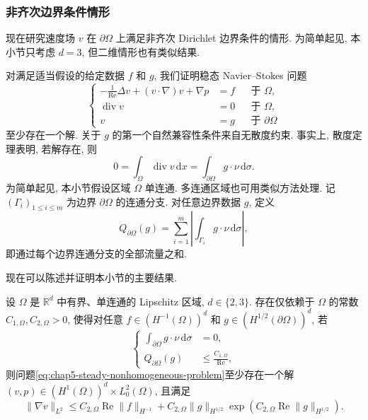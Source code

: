 \subsubsection{非齐次边界条件情形}
\label{subsec:chap5-steady-nonhomogeneous-boundary}

现在研究速度场 $v$ 在 $\partial\Omega$ 上满足非齐次 Dirichlet 边界条件的情形. 为简单起见, 本小节只考虑 $d=3$, 但二维情形也有类似结果.

对满足适当假设的给定数据 $f$ 和 $g$, 我们证明稳态 Navier--Stokes 问题
\begin{equation}
\left\{
\begin{aligned}
 -\frac1{\operatorname{Re}}\Delta v+(v\cdot\nabla)v+\nabla p&=f&&\text{于 }\Omega,\\
 \operatorname{div}v&=0&&\text{于 }\Omega,\\
 v&=g&&\text{于 }\partial\Omega
\end{aligned}
\right.
\label{eq:chap5-steady-nonhomogeneous-problem}
\end{equation}
至少存在一个解. 关于 $g$ 的第一个自然兼容性条件来自无散度约束. 事实上, 散度定理表明, 若解存在, 则
\[
 0=\int_\Omega\operatorname{div}v\,\mathrm dx
 =\int_{\partial\Omega}g\cdot\nu\,\mathrm d\sigma.
\]
为简单起见, 本小节假设区域 $\Omega$ 单连通. 多连通区域也可用类似方法处理. 记 $(\Gamma_i)_{1\leq i\leq m}$ 为边界 $\partial\Omega$ 的连通分支. 对任意边界数据 $g$, 定义
\[
 Q_{\partial\Omega}(g)=\sum_{i=1}^m\left|\int_{\Gamma_i}g\cdot\nu\,\mathrm d\sigma\right|,
\]
即通过每个边界连通分支的全部流量之和.

现在可以陈述并证明本小节的主要结果.

\begin{Theorem}
\label{thm:chap5-steady-nonhomogeneous-existence}
设 $\Omega$ 是 $\mathbb R^d$ 中有界、单连通的 Lipschitz 区域, $d\in\{2,3\}$. 存在仅依赖于 $\Omega$ 的常数 $C_{1,\Omega},C_{2,\Omega}>0$, 使得对任意 $f\in(H^{-1}(\Omega))^d$ 和 $g\in(H^{1/2}(\partial\Omega))^d$, 若
\begin{equation}
\left\{
\begin{aligned}
 \int_{\partial\Omega}g\cdot\nu\,\mathrm d\sigma&=0,\\
 Q_{\partial\Omega}(g)&\leq\frac{C_{1,\Omega}}{\operatorname{Re}},
\end{aligned}
\right.
\label{eq:chap5-steady-boundary-smallness}
\end{equation}
则问题\eqref{eq:chap5-steady-nonhomogeneous-problem}至少存在一个解 $(v,p)\in(H^1(\Omega))^d\times L_0^2(\Omega)$, 且满足
\begin{equation}
 \|\nabla v\|_{L^2}
 \leq C_{2,\Omega}\operatorname{Re}\|f\|_{H^{-1}}
 +C_{2,\Omega}\|g\|_{H^{1/2}}
 \exp\!\left(C_{2,\Omega}\operatorname{Re}\|g\|_{H^{1/2}}\right).
\label{eq:chap5-steady-nonhomogeneous-estimate}
\end{equation}
\end{Theorem}


